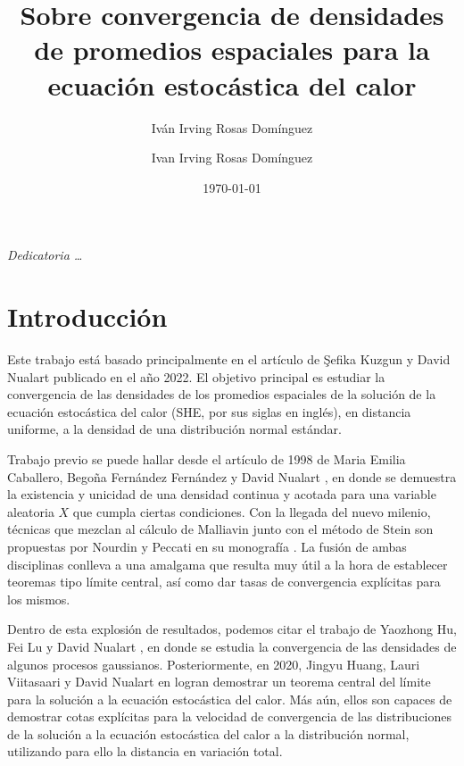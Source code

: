 \documentclass[letterpaper,twoside,12pt]{book}
\title{\textbf{}}
\author{Iván Irving Rosas Domínguez}
\date{\today}
\author{Ivan Irving Rosas Domínguez}
\title{Sobre convergencia de densidades de promedios espaciales para la ecuación estocástica del calor}
\newcommand{\1}{\mathds{1}}
\theoremstyle{definition}
\theoremstyle{definition}
\theoremstyle{remark}
\theoremstyle{definition}
\theoremstyle{definition}
\theoremstyle{definition}
\theoremstyle{definition}
\theoremstyle{definition}
\begin{document}
\maketitle 
\thispagestyle{empty}  
\frontmatter

\chapter*{}
\begin{flushright}%
 \emph{Dedicatoria \dots}
  \thispagestyle{empty}
\end{flushright}

\chapter*{Introducción}

Este trabajo está basado principalmente en el artículo de \c{S}efika Kuzgun y David Nualart \cite{KUZGUN202268} publicado en el año 2022. El objetivo principal es estudiar la convergencia de las densidades de los promedios espaciales de la solución de la ecuación estocástica del calor (SHE, por sus siglas en inglés), en distancia uniforme, a la densidad de una distribución normal estándar. 

Trabajo previo se puede hallar desde el artículo de 1998 de Maria Emilia Caballero, Begoña Fernández Fernández y David Nualart \cite{Caballero1998-hz}, en donde se demuestra la existencia y unicidad de una densidad continua y acotada para una variable aleatoria $X$ que cumpla ciertas condiciones. Con la llegada del nuevo milenio, técnicas que mezclan al cálculo de Malliavin junto con el método de Stein son propuestas por Nourdin y Peccati en su monografía \cite{Nourdin_Peccati_2012}. La fusión de ambas disciplinas conlleva a una amalgama que resulta muy útil a la hora de establecer teoremas tipo límite central, así como dar tasas de convergencia explícitas para los mismos. 

Dentro de esta explosión de resultados, podemos citar el trabajo de Yaozhong Hu, Fei Lu y David Nualart \cite{HU2014814}, en donde se estudia la convergencia de las densidades de algunos procesos gaussianos. Posteriormente, en 2020, Jingyu Huang, Lauri Viitasaari y David Nualart en \cite{HUANG20207170} logran demostrar un teorema central del límite para la solución a la ecuación estocástica del calor. Más aún, ellos son capaces de demostrar cotas explícitas para la velocidad de convergencia de las distribuciones de la solución a la ecuación estocástica del calor a la distribución normal, utilizando para ello la distancia en variación total. 
\end{document}
